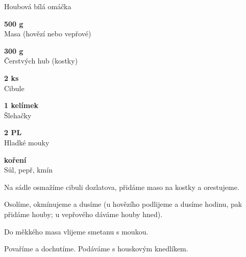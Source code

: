 \documentclass[11pt,a4paper]{article}
\begin{document}
\begin{recipe}[OliveGreen]{Houbová bílá omáčka}
    \begin{ingredients}
        \item \parbox[t]{\linewidth}{\raggedright \weight \textbf{500 g}\\ Masa (hovězí nebo vepřové)}
        \item \parbox[t]{\linewidth}{\raggedright \weight \textbf{300 g}\\ Čerstvých hub (kostky)}
        \item \parbox[t]{\linewidth}{\raggedright \piece \textbf{2 ks}\\ Cibule}
        \item \parbox[t]{\linewidth}{\raggedright \liquid \textbf{1 kelímek}\\ Šlehačky}
        \item \parbox[t]{\linewidth}{\raggedright \spoon \textbf{2 PL}\\ Hladké mouky}
        \item \parbox[t]{\linewidth}{\raggedright \indefinite \textbf{koření}\\ Sůl, pepř, kmín}
    \end{ingredients}
    \begin{steps}
        \item Na sádle osmažíme cibuli dozlatova, přidáme maso na kostky a orestujeme.
        \item Osolíme, okmínujeme a dusíme (u hovězího podlijeme a dusíme hodinu, pak přidáme houby; u vepřového dáváme houby hned).
        \item Do měkkého masa vlijeme smetanu s moukou.
        \item Povaříme a dochutíme. Podáváme s houskovým knedlíkem.
    \end{steps}
\end{recipe}

\end{document}
